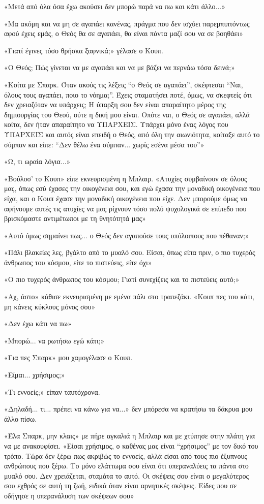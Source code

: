 \documentclass[12pt,twoside, openany]{book}
\begin{document}
«Μετά από όλα όσα έχω ακούσει δεν μπορώ παρά να πω και κάτι άλλο...»

«Μα ακόμη και να μη σε αγαπάει κανένας, πράγμα που δεν ισχύει παρεμπιπτόντως αφού έχεις εμάς, ο Θεός θα σε αγαπάει, θα είναι πάντα μαζί σου να σε βοηθάει»

«Γιατί έγινες τόσο θρήσκα ξαφνικά;» γέλασε ο Κουπ.

«Ο Θεός; Πώς γίνεται να με αγαπάει και να με βάζει να περνάω τόσα δεινά;»

«Κοίτα με Σπαρκ. Όταν ακούς τις λέξεις “ο Θεός σε αγαπάει”, σκέφτεσαι “Ναι, όλους τους αγαπάει, ποιο το νόημα;”. Έχεις σταματήσει ποτέ, όμως, να σκεφτείς ότι δεν χρειαζόταν να υπάρχεις; Η ύπαρξη σου δεν είναι απαραίτητο μέρος της δημιουργίας του Θεού, ούτε η δική μου είναι. Οπότε ναι, ο Θεός σε αγαπάει, αλλά κοίτα, δεν ήταν απαραίτητο να ΥΠΑΡΧΕΙΣ. Υπάρχει μόνο ένας λόγος που ΥΠΑΡΧΕΙΣ και αυτός είναι επειδή ο Θεός, από όλη την αιωνιότητα, κοίταξε αυτό το σύμπαν και είπε: “Δεν θέλω ένα σύμπαν... χωρίς εσένα μέσα του”»

«Ω, τι ωραία λόγια...»

«Βούλοσ’ το Κουπ» είπε εκνευρισμένη η Μπλαιρ. «Ατυχίες συμβαίνουν σε όλους μας, όπως εσύ έχασες την οικογένεια σου, και εγώ έχασα την μοναδική οικογένεια που είχα, και ο Κουπ έχασε την μοναδική οικογένεια που είχε. Δεν μπορούμε όμως να αφήνουμε αυτές τις ατυχίες να μας ρίχνουν τόσο πολύ ψυχολογικά σε επίπεδο που βρισκόμαστε αντιμέτωποι με τη θνητότητά μας»

«Αυτό όμως σημαίνει πως... ο Θεός δεν αγαπούσε τους υπόλοιπους που πέθαναν;»

«Πάλι βλακείες λες, βγάλτο από το μυαλό σου. Είσαι, όπως είπα πριν, ο πιο τυχερός άνθρωπος του κόσμου, είτε το πιστεύεις, είτε όχι»

«Ο πιο τυχερός άνθρωπος του κόσμου; Γιατί συνεχίζεις και το πιστεύεις αυτό;»

«Αχ, άστο» κάθισε εκνευρισμένη με εμένα πάλι στο τραπεζάκι. «Κουπ πες του κάτι, μη κάνεις κύκλους μόνος σου»

«Δεν έχω κάτι να πω»

«Μπορώ... να ρωτήσω εγώ κάτι;»

«Για πες Σπαρκ» μου χαμογέλασε ο Κουπ.

«Είμαι... χρήσιμος;»

«Τι εννοείς;» είπαν ταυτόχρονα.

«Δηλαδή... τι... πρέπει να κάνω για να...» δεν μπόρεσα να κρατήσω τα δάκρυα μου άλλο πίσω.

«Έλα Σπαρκ, μην κλαις» με πήρε αγκαλιά η Μπλαιρ και με χτύπησε στην πλάτη για να με ανακουφίσει. «Είσαι χρήσιμος, ο καθένας μας είναι “χρήσιμος” με τον δικό του τρόπο. Τώρα δεν ξέρω πως ακριβώς το εννοείς, αλλά είσαι από τους πιο έξυπνους ανθρώπους που ξέρω. Το μόνο ελάττωμα σου είναι ότι υπεραναλύεις τα πάντα στο μυαλό σου. Δεν χρειάζεται, σταμάτα το αυτό. Οι σκέψεις σου είναι ο μεγαλύτερος σου εχθρός σε αυτή τη ζωή, ειδικά όταν είναι αρνητικές σκέψεις. Είδες που σε οδήγησε η υπερανάλυση των σκέψεων σου»
\end{document}

